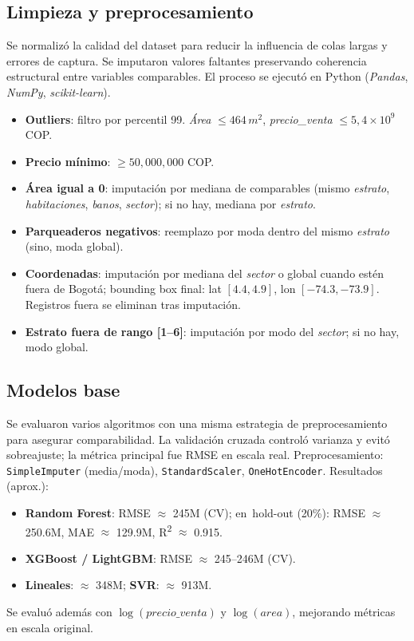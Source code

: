 \subsection*{Limpieza y preprocesamiento}
Se normalizó la calidad del dataset para reducir la influencia de colas largas y errores de captura. Se imputaron valores faltantes preservando coherencia estructural entre variables comparables. El proceso se ejecutó en Python (\textit{Pandas}, \textit{NumPy}, \textit{scikit-learn}).
\begin{itemize}
    \item \textbf{Outliers}: filtro por percentil 99. \emph{Área} \(\leq 464\,m^2\), \emph{precio\_venta} \(\leq 5{,}4\times 10^9\) COP.
    \item \textbf{Precio mínimo}: \(\geq 50{,}000{,}000\) COP.
    \item \textbf{Área igual a 0}: imputación por mediana de comparables (mismo \emph{estrato}, \emph{habitaciones}, \emph{banos}, \emph{sector}); si no hay, mediana por \emph{estrato}.
    \item \textbf{Parqueaderos negativos}: reemplazo por moda dentro del mismo \emph{estrato} (sino, moda global).
    \item \textbf{Coordenadas}: imputación por mediana del \emph{sector} o global cuando estén fuera de Bogotá; bounding box final: lat \([4.4, 4.9]\), lon \([-74.3, -73.9]\). Registros fuera se eliminan tras imputación.
    \item \textbf{Estrato fuera de rango [1--6]}: imputación por modo del \emph{sector}; si no hay, modo global.
\end{itemize}

\subsection*{Modelos base}
Se evaluaron varios algoritmos con una misma estrategia de preprocesamiento para asegurar comparabilidad. La validación cruzada controló varianza y evitó sobreajuste; la métrica principal fue RMSE en escala real.
Preprocesamiento: \texttt{SimpleImputer} (media/moda), \texttt{StandardScaler}, \texttt{OneHotEncoder}. Resultados (aprox.):
\begin{itemize}
    \item \textbf{Random Forest}: RMSE \(\approx\) 245M (CV); en\ hold-out (20\%): RMSE \(\approx\) 250.6M, MAE \(\approx\) 129.9M, R\textsuperscript{2} \(\approx\) 0.915.
    \item \textbf{XGBoost / LightGBM}: RMSE \(\approx\) 245--246M (CV).
    \item \textbf{Lineales}: \(\approx\) 348M; \textbf{SVR}: \(\approx\) 913M.
\end{itemize}
Se evaluó además con \(\log(\textit{precio\_venta})\) y \(\log(\textit{area})\), mejorando métricas en escala original.



